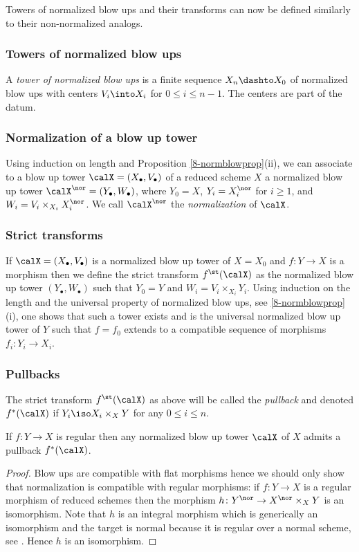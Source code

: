 \documentclass[10pt]{../fichiers-configuration-latex/smfart}
\begin{document}
Towers of normalized blow ups and their transforms can now be
defined similarly to their non-normalized analogs.

\subsubsection{Towers of normalized blow ups}\label{8-normtowersec}
A {\em tower of normalized blow ups} is a finite sequence $X_n\dashto
X_0$ of normalized blow ups with centers $V_i\into X_i$ for $0\le
i\le n-1$. The centers are part of the datum.

\subsubsection{Normalization of a blow up tower}\label{8-norblowsec}
Using induction on length and Proposition \ref{8-normblowprop}(ii),
we can associate to a blow up tower $\calX=(X_\bullet,V_\bullet)$
of a reduced scheme $X$ a normalized blow up tower
$\calX^\nor=(Y_\bullet,W_\bullet)$, where $Y_0=X$, $Y_i=X_i^\nor$ for
$i\ge 1$, and $W_i=V_i\times_{X_i}X^\nor_i$. We call $\calX^\nor$
the {\em normalization} of $\calX$.

\subsubsection{Strict transforms}\label{8-strnorsec}
If $\calX=(X_\bullet,V_\bullet)$ is a normalized blow up
tower of $X=X_0$ and $f{\colon}Y\to X$ is a morphism
then we define the strict transform $f^\st(\calX)$ as
the normalized blow up tower $(Y_\bullet,W_\bullet)$ such that
$Y_0=Y$ and $W_i=V_i\times_{X_i}Y_i$. Using induction on the
length and the universal property of normalized blow ups, see
\ref{8-normblowprop}(i), one shows that such a tower exists and is
the universal normalized blow up tower of $Y$ such that $f=f_0$
extends to a compatible sequence of morphisms $f_i{\colon}Y_i\to
X_i$.

\subsubsection{Pullbacks}\label{8-normpullsec} The strict transform
$f^\st(\calX)$ as above will be called the {\em pullback} and denoted
$f^*(\calX)$ if $Y_i\iso X_i\times_XY$ for any $0\le i\le n$.

\begin{lemma2}\label{8-smoothpulllem} If $f{\colon}Y\to X$ is
regular then any normalized blow up tower $\calX$ of $X$ admits
a pullback $f^*(\calX)$.  \end{lemma2} \begin{proof} Blow ups
are compatible with flat morphisms hence we should only show that
normalization is compatible with regular morphisms: if $f{\colon}Y\to
X$ is a regular morphism of reduced schemes then the morphism
$h{\colon}Y^\nor\to X^\nor\times_XY$ is an isomorphism. Note that
$h$ is an integral morphism which is generically an isomorphism and
the target is normal because it is regular over a normal scheme,
see \cite[21.E(iii)]{CA@Matsumura}. Hence $h$ is an isomorphism.
\end{proof}
\end{document}

